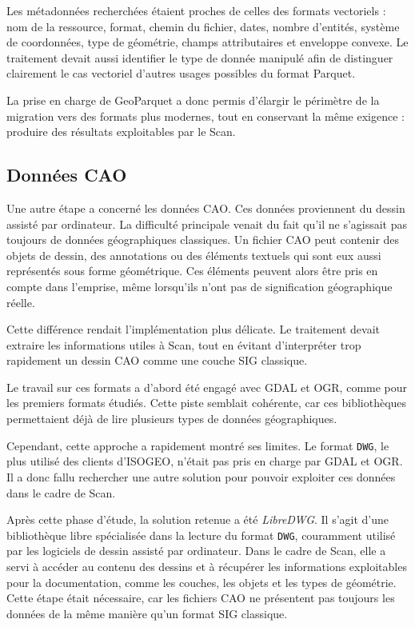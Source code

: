 Les métadonnées recherchées étaient proches de celles des formats vectoriels :
nom de la ressource, format, chemin du fichier, dates, nombre d'entités, système
de coordonnées, type de géométrie, champs attributaires et enveloppe convexe. Le
traitement devait aussi identifier le type de donnée manipulé afin de distinguer
clairement le cas vectoriel d'autres usages possibles du format Parquet.

La prise en charge de GeoParquet a donc permis d'élargir le périmètre de la
migration vers des formats plus modernes, tout en conservant la même exigence :
produire des résultats exploitables par le Scan.


\subsection{Données CAO}
\label{subsec:donnees_cao}

Une autre étape a concerné les données CAO. Ces données proviennent du dessin
assisté par ordinateur. La difficulté principale venait du fait qu'il ne
s'agissait pas toujours de données géographiques classiques. Un fichier CAO peut
contenir des objets de dessin, des annotations ou des éléments textuels qui sont
eux aussi représentés sous forme géométrique. Ces éléments peuvent alors être
pris en compte dans l'emprise, même lorsqu'ils n'ont pas de signification
géographique réelle.

Cette différence rendait l'implémentation plus délicate. Le traitement devait
extraire les informations utiles à Scan, tout en évitant d'interpréter trop
rapidement un dessin CAO comme une couche SIG classique.

Le travail sur ces formats a d'abord été engagé avec GDAL et OGR, comme pour les
premiers formats étudiés. Cette piste semblait cohérente, car ces bibliothèques
permettaient déjà de lire plusieurs types de données géographiques.

Cependant, cette approche a rapidement montré ses limites. Le format
\texttt{DWG}, le plus utilisé des clients d'ISOGEO, n'était pas pris en charge par
GDAL et OGR. Il a donc fallu rechercher une autre solution pour pouvoir exploiter
ces données dans le cadre de Scan.

Après cette phase d'étude, la solution retenue a été \textit{LibreDWG}. Il
s'agit d'une bibliothèque libre spécialisée dans la lecture du format
\texttt{DWG}, couramment utilisé par les logiciels de dessin assisté par
ordinateur. Dans le cadre de Scan, elle a servi à accéder au contenu des dessins
et à récupérer les informations exploitables pour la documentation, comme les
couches, les objets et les types de géométrie. Cette étape était nécessaire, car
les fichiers CAO ne présentent pas toujours les données de la même manière qu'un
format SIG classique.

